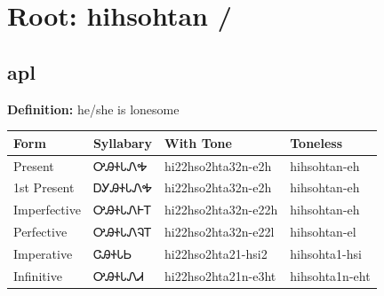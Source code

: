 \documentclass{article}%
\begin{document}
%
\normalsize%
\section*{Root: hihsohtan / }%
\subsection*{apl}%
\textbf{Definition: }%
he/she is lonesome%
\\[0.5em]%
\begin{tabular}{|l|l|l|l|}%
\hline%
\textbf{Form}&\textbf{Syllabary}&\textbf{With Tone}&\textbf{Toneless}\\%
\hline%
Present&ᎤᎯᏐᏓᏁᎭ&hi22hso2hta32n{-}e2h&hihsohtan{-}eh\\%
1st Present&ᎠᎩᎯᏐᏓᏁᎭ&hi22hso2hta32n{-}e2h&hihsohtan{-}eh\\%
Imperfective&ᎤᎯᏐᏓᏁᎰᎢ&hi22hso2hta32n{-}e22h&hihsohtan{-}eh\\%
Perfective&ᎤᎯᏐᏓᏁᎸᎢ&hi22hso2hta32n{-}e22l&hihsohtan{-}el\\%
Imperative&ᏣᎯᏐᏓᏏ&hi22hso2hta21{-}hsi2&hihsohta1{-}hsi\\%
Infinitive&ᎤᎯᏐᏓᏁᏗ&hi22hso2hta21n{-}e3ht&hihsohta1n{-}eht\\%
\hline%
\end{tabular}%
\\[1em]%
\end{document}
